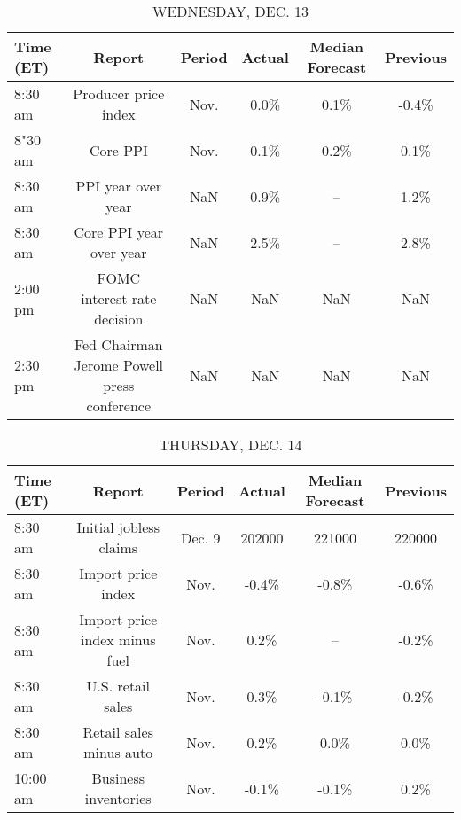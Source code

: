 \documentclass{article}%
\begin{document}
\begin{table}[htbp]%
\caption{WEDNESDAY, DEC. 13}%
\centering%
\begin{adjustbox}{width=1\textwidth}%
\begin{tabular}{lccccc}
\toprule
Time (ET) &                                      Report & Period & Actual & Median Forecast & Previous \\
\midrule
  8:30 am &                        Producer price index &   Nov. &   0.0\% &            0.1\% &    -0.4\% \\
  8"30 am &                                    Core PPI &   Nov. &   0.1\% &            0.2\% &     0.1\% \\
  8:30 am &                          PPI year over year &    NaN &   0.9\% &              -- &     1.2\% \\
  8:30 am &                     Core PPI year over year &    NaN &   2.5\% &              -- &     2.8\% \\
  2:00 pm &                 FOMC interest-rate decision &    NaN &    NaN &             NaN &      NaN \\
  2:30 pm & Fed Chairman Jerome Powell press conference &    NaN &    NaN &             NaN &      NaN \\
\bottomrule
\end{tabular}
%
\end{adjustbox}%
\end{table}

%


\begin{table}[htbp]%
\caption{THURSDAY, DEC. 14}%
\centering%
\begin{adjustbox}{width=1\textwidth}%
\begin{tabular}{lccccc}
\toprule
Time (ET) &                        Report & Period & Actual & Median Forecast & Previous \\
\midrule
  8:30 am &        Initial jobless claims & Dec. 9 & 202000 &          221000 &   220000 \\
  8:30 am &            Import price index &   Nov. &  -0.4\% &           -0.8\% &    -0.6\% \\
  8:30 am & Import price index minus fuel &   Nov. &   0.2\% &              -- &    -0.2\% \\
  8:30 am &             U.S. retail sales &   Nov. &   0.3\% &           -0.1\% &    -0.2\% \\
  8:30 am &       Retail sales minus auto &   Nov. &   0.2\% &            0.0\% &     0.0\% \\
 10:00 am &          Business inventories &   Nov. &  -0.1\% &           -0.1\% &     0.2\% \\
\bottomrule
\end{tabular}
%
\end{adjustbox}%
\end{table}
\end{document}
